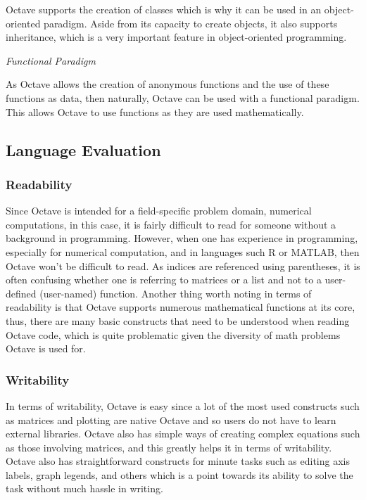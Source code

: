 \documentclass{article}
\begin{document}
\par
Octave supports the creation of classes which is why it can be used in an object-oriented paradigm. Aside from its capacity to create objects, it also supports inheritance, which is a very important feature in object-oriented programming.

\par
\noindent
\textit{Functional Paradigm}

\par
As Octave allows the creation of anonymous functions and the use of these functions as data, then naturally, Octave can be used with a functional paradigm. This allows Octave to use functions as they are used mathematically.

\subsection*{Language Evaluation}

\subsubsection*{Readability}
\par
Since Octave is intended for a field-specific problem domain, numerical computations, in this case, it is fairly difficult to read for someone without a background in programming. However, when one has experience in programming, especially for numerical computation, and in languages such R or MATLAB, then Octave won’t be difficult to read. As indices are referenced using parentheses, it is often confusing whether one is referring to matrices or a list and not to a user-defined (user-named) function. Another thing worth noting in terms of readability is that Octave supports numerous mathematical functions at its core, thus, there are many basic constructs that need to be understood when reading Octave code, which is quite problematic given the diversity of math problems Octave is used for.

\subsubsection*{Writability}
\par
In terms of writability, Octave is easy since a lot of the most used constructs such as matrices and plotting are native Octave and so users do not have to learn external libraries. Octave also has simple ways of creating complex equations such as those involving matrices, and this greatly helps it in terms of writability. Octave also has straightforward constructs for minute tasks such as editing axis labels, graph legends, and others which is a point towards its ability to solve the task without much hassle in writing.
\end{document}
